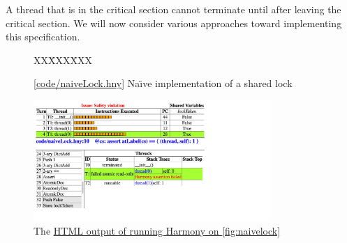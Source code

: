 \documentclass{report}
\newcommand{\harmonysource}[1]{
\begin{tabbing}
XX\=XXX\=XXX\kill
    
\end{tabbing}
}
\newcommand{\harmonylink}[1]{%
[\href{https://harmony.cs.cornell.edu/#1}{\underline{#1}}]%
}
\newcommand{\harmonyref}[2]{%
\href{https://harmony.cs.cornell.edu/output/#1}{\underline{#2}}%
}
\newenvironment{code}{
\tcolorbox
}{
\endtcolorbox
}
\begin{document}

A thread that is in the critical
section cannot terminate until after leaving the critical section.
We will now consider various approaches toward implementing this
specification.

\begin{figure}
\begin{code}
\harmonysource{naiveLock}
\end{code}
\caption{\harmonylink{code/naiveLock.hny} Na\"{\i}ve implementation of a shared lock}
\label{fig:naivelock}
\end{figure}

\begin{figure}
\begin{center}
\includegraphics[width=0.8\textwidth]{figures/naiveLock.pdf}
\end{center}
\caption{The \harmonyref{naiveLock.html}{HTML output of running Harmony on \autoref{fig:naivelock}}}
\label{fig:naiveLockhtml}
\end{figure}
\end{document}
